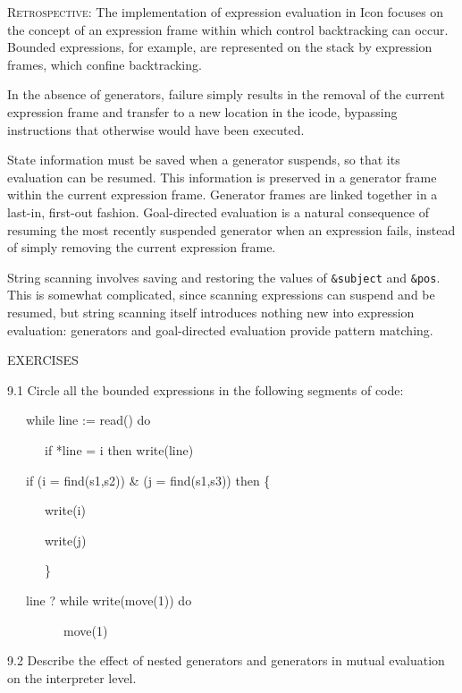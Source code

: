 \textsc{Retrospective}: The implementation of expression evaluation in
Icon focuses on the concept of an expression frame within which
control backtracking can occur. Bounded expressions, for example, are
represented on the stack by expression frames, which confine
backtracking.

In the absence of generators, failure simply results in the removal of
the current expression frame and transfer to a new location in the
icode, bypassing instructions that otherwise would have been executed.

State information must be saved when a generator suspends, so that its
evaluation can be resumed. This information is preserved in a
generator frame within the current expression frame. Generator frames
are linked together in a last-in, first-out fashion. Goal-directed
evaluation is a natural consequence of resuming the most recently
suspended generator when an expression fails, instead of simply
removing the current expression frame.

String scanning involves saving and restoring the values of
\texttt{\&subject} and \texttt{\&pos}. This is somewhat complicated,
since scanning expressions can suspend and be resumed, but string
scanning itself introduces nothing new into expression evaluation:
generators and goal-directed evaluation provide {\textquotedbl}pattern
matching.{\textquotedbl}


EXERCISES


9.1 Circle all the bounded expressions in the following segments of code:

{\ttfamily\mdseries
\ \ \ while line := read() do}

{\ttfamily\mdseries
\ \ \ \ \ \ if *line = i then write(line)}


\bigskip

{\ttfamily\mdseries
\ \ \ if (i = find(s1,s2)) \& (j = find(s1,s3)) then \{}

{\ttfamily\mdseries
\ \ \ \ \ \ write(i)}

{\ttfamily\mdseries
\ \ \ \ \ \ write(j)}

{\ttfamily\mdseries
\ \ \ \ \ \ \}}


\bigskip

{\ttfamily\mdseries
\ \ \ line ? while write(move(1)) do}

{\ttfamily\mdseries
\ \ \ \ \ \ \ \ \ move(1)}


9.2 Describe the effect of nested generators and generators in mutual
evaluation on the interpreter level.


